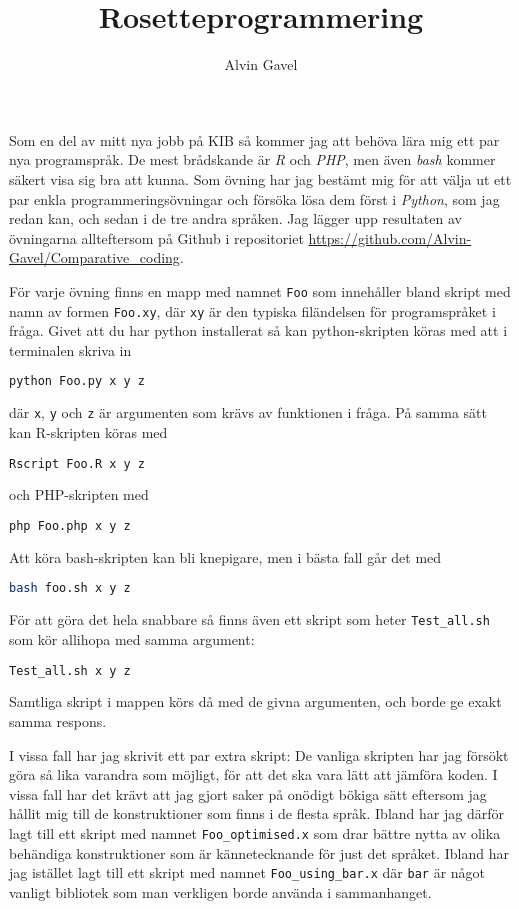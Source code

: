 \documentclass[10pt, twoside,a4paper]{article}
\title{Rosetteprogrammering}
\author{Alvin Gavel}
\date{}                                           %
\begin{document}
\maketitle

\noindent
Som en del av mitt nya jobb på KIB så kommer jag att behöva lära mig ett par nya programspråk. De mest brådskande är \emph{R} och \emph{PHP}, men även \emph{bash} kommer säkert visa sig bra att kunna. Som övning har jag bestämt mig för att välja ut ett par enkla programmeringsövningar och försöka lösa dem först i \emph{Python}, som jag redan kan, och sedan i de tre andra språken. Jag lägger upp resultaten av övningarna allteftersom på Github i repositoriet \url{https://github.com/Alvin-Gavel/Comparative_coding}.

För varje övning finns en mapp med namnet \verb+Foo+ som innehåller bland skript med namn av formen \verb+Foo.xy+, där \verb+xy+ är den typiska filändelsen för programspråket i fråga. Givet att du har python installerat så kan python-skripten köras med att i terminalen skriva in
\begin{lstlisting}[language=bash]
python Foo.py x y z
\end{lstlisting}
där \verb+x+, \verb+y+ och \verb+z+ är argumenten som krävs av funktionen i fråga. På samma sätt kan R-skripten köras med
\begin{lstlisting}[language=bash]
Rscript Foo.R x y z
\end{lstlisting}
och PHP-skripten med 
\begin{lstlisting}[language=bash]
php Foo.php x y z
\end{lstlisting}
Att köra bash-skripten kan bli knepigare, men i bästa fall går det med
\begin{lstlisting}[language=bash]
bash foo.sh x y z
\end{lstlisting}
För att göra det hela snabbare så finns även ett skript som heter \verb+Test_all.sh+ som kör allihopa med samma argument:
\begin{lstlisting}[language=bash]
Test_all.sh x y z
\end{lstlisting}
Samtliga skript i mappen körs då med de givna argumenten, och borde ge exakt samma respons.

I vissa fall har jag skrivit ett par extra skript: De vanliga skripten har jag försökt göra så lika varandra som möjligt, för att det ska vara lätt att jämföra koden. I vissa fall har det krävt att jag gjort saker på onödigt bökiga sätt eftersom jag hållit mig till de konstruktioner som finns i de flesta språk. Ibland har jag därför lagt till ett skript med namnet \verb+Foo_optimised.x+ som drar bättre nytta av olika behändiga konstruktioner som är kännetecknande för just det språket. Ibland har jag istället lagt till ett skript med namnet \verb+Foo_using_bar.x+ där \verb+bar+ är något vanligt bibliotek som man verkligen borde använda i sammanhanget.
\end{document}
